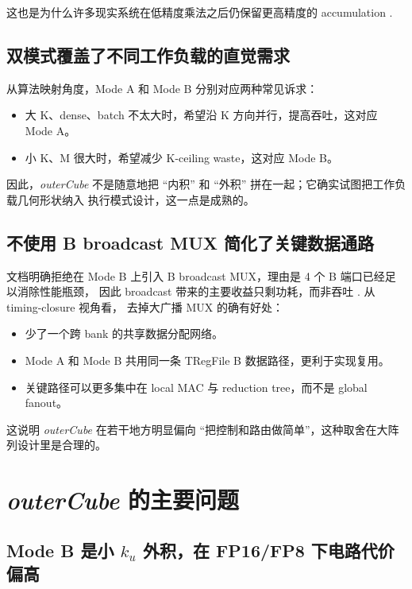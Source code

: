 \documentclass[UTF8,11pt,a4paper]{ctexart}
\newcommand{\ku}{\ensuremath{k_u}}
\newcommand{\modea}{Mode A}
\newcommand{\modeb}{Mode B}
\newcommand{\outercube}{\textit{outerCube}}
\begin{document}
这也是为什么许多现实系统在低精度乘法之后仍保留更高精度的 accumulation \cite{deepseekv3,abs}.

\subsection{双模式覆盖了不同工作负载的直觉需求}

从算法映射角度，\modea{} 和 \modeb{} 分别对应两种常见诉求：

\begin{itemize}
  \item 大 K、dense、batch 不太大时，希望沿 K 方向并行，提高吞吐，这对应 \modea{}。
  \item 小 K、M 很大时，希望减少 K-ceiling waste，这对应 \modeb{}。
\end{itemize}

因此，\outercube{} 不是随意地把 ``内积'' 和 ``外积'' 拼在一起；它确实试图把工作负载几何形状纳入
执行模式设计，这一点是成熟的。

\subsection{不使用 B broadcast MUX 简化了关键数据通路}

文档明确拒绝在 \modeb{} 上引入 B broadcast MUX，理由是 4 个 B 端口已经足以消除性能瓶颈，
因此 broadcast 带来的主要收益只剩功耗，而非吞吐 \cite{outercube}. 从 timing-closure 视角看，
去掉大广播 MUX 的确有好处：

\begin{itemize}
  \item 少了一个跨 bank 的共享数据分配网络。
  \item Mode A 和 Mode B 共用同一条 TRegFile B 数据路径，更利于实现复用。
  \item 关键路径可以更多集中在 local MAC 与 reduction tree，而不是 global fanout。
\end{itemize}

这说明 \outercube{} 在若干地方明显偏向 ``把控制和路由做简单''，这种取舍在大阵列设计里是合理的。

\section{\outercube{} 的主要问题}

\subsection{\modeb{} 是小 $\ku$ 外积，在 FP16/FP8 下电路代价偏高}
\end{document}

